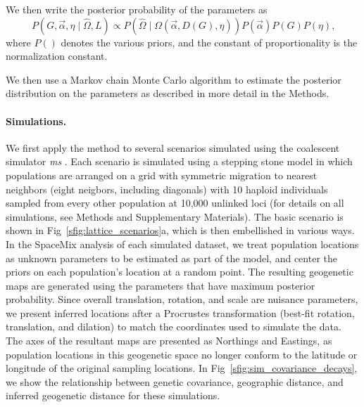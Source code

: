 \documentclass[10pt,letterpaper]{article}
\begin{document}
We then write the posterior probability of the parameters as 
\begin{equation}
\label{eq:cyol_prob}
P \left( G, \vec{\alpha}, \eta \mid \widehat{\Omega}, L \right) \propto  
	P \left( \widehat{\Omega}  \mid \Omega(\vec{\alpha},{D}(G),\eta ) \right) P(\vec{\alpha}) P(G) P(\eta) \text{,}
\end{equation}
where $P( )$ denotes the various priors, and the constant of proportionality is the normalization constant.  

We then use a Markov chain Monte Carlo algorithm to estimate the posterior distribution on the parameters as described in more detail in the Methods.


\paragraph{Simulations.} 
We first apply the method to several scenarios simulated using the coalescent simulator \textit{ms} \cite{Hudson2002}.  
Each scenario is simulated using a stepping stone model in which populations are arranged on a grid with symmetric migration 
to nearest neighbors (eight neigbors, including diagonals)
with 10 haploid individuals sampled from every other population at 10,000 unlinked loci (for details on all simulations, see Methods and Supplementary Materials).  
The basic scenario is shown in Fig\ \ref{sfig:lattice_scenarios}a, 
which is then embellished in various ways.
In the SpaceMix analysis of each simulated dataset, 
we treat population locations as unknown parameters to be estimated as part of the model, 
and center the priors on each population's location at a random point.
The resulting geogenetic maps are generated using the parameters that have maximum posterior probability.
Since overall translation, rotation, and scale are nuisance parameters,
we present inferred locations after a Procrustes transformation
(best-fit rotation, translation, and dilation) 	
to match the coordinates used to simulate the data.  
The axes of the resultant maps are presented as Northings and Eastings, 
as population locations in this geogenetic space no longer conform 
to the latitude or longitude of the original sampling locations.
In Fig\ \ref{sfig:sim_covariance_decays}, we show the relationship between genetic covariance, 
geographic distance, and inferred geogenetic distance for these simulations.
%
\end{document}
